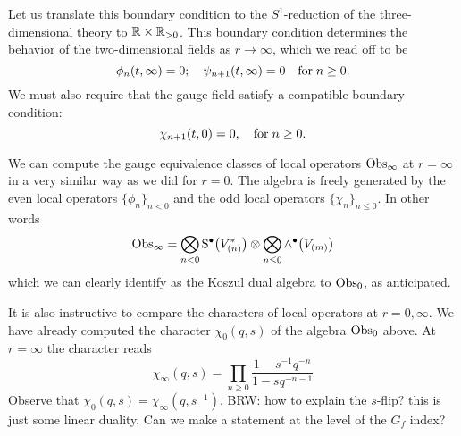 \documentclass[11pt]{amsart}
\def\brian#1{{\textcolor{blue!65!red}{BRW: {#1}}}}
\begin{document}
Let us translate this boundary condition to the $S^1$-reduction of the three-dimensional theory to $\mathbb R \times \mathbb R_{>0}$. 
This boundary condition determines the behavior of the two-dimensional fields as $r \to \infty$, which we read off to be 
\begin{equation}\label{eqn:bc2}
\phi_n (t, \infty) = 0 ; \quad \psi_{n+1} (t, \infty) = 0 \quad {\rm for} \; n \geq 0 .
\end{equation}
We must also require that the gauge field satisfy a compatible boundary condition:
\begin{equation}\label{eqn:gbc2}
\chi_{n+1} (t,0) = 0, \quad {\rm for} \; n \geq 0 .
\end{equation}

We can compute the gauge equivalence classes of local operators ${\rm Obs}_\infty$ at $r = \infty$ in a very similar way as we did for $r = 0$. 
The algebra is freely generated by the even local operators $\{\phi_n\}_{n < 0}$ and the odd local operators $\{\chi_n\}_{n \leq 0}$. 
In other words
\[
{\rm Obs}_\infty = \bigotimes_{n < 0} {\rm S}^\bullet \big(V^*_{(n)}\big) \otimes \bigotimes_{n \leq 0} \wedge^\bullet \big(V_{(m)}\big)
\]
which we can clearly identify as the Koszul dual algebra to ${\rm Obs}_0$, as anticipated.

It is also instructive to compare the characters of local operators at $r = 0, \infty$. 
We have already computed the character $\chi_0(q,s)$ of the algebra ${\rm Obs}_0$ above. 
At $r=\infty$ the character reads 
\[
\chi_\infty (q,s) = \prod_{n \geq 0} \frac{1 - s^{-1}q^{-n}}{1 - s q^{-n-1}}
\]
Observe that $\chi_0 (q,s) = \chi_\infty (q, s^{-1})$. 
\brian{how to explain the $s$-flip? this is just some linear duality. Can we make a statement at the level of the $G_f$ index?}
\end{document}
